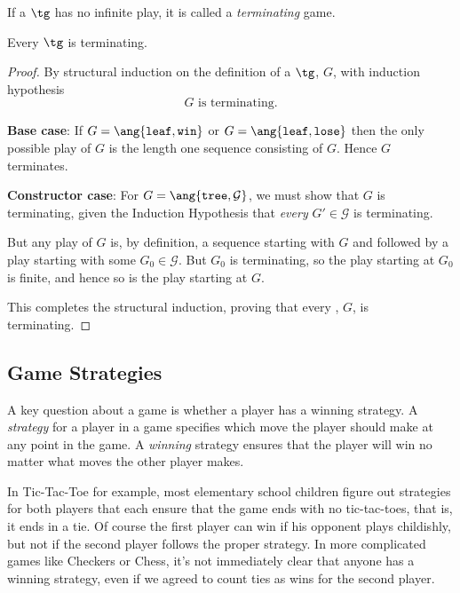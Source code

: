 \begin{definition}
\begin{definition}
If a $\tg$ has no infinite play, it is called a \emph{terminating} game.
\end{definition}

\begin{theorem}
Every $\tg$ is terminating.
\end{theorem}

\begin{proof}
By structural induction on the definition of a $\tg$, $G$, with induction
hypothesis
\[
G \text{ is terminating}.
\]

\textbf{Base case}: If $G = \ang{\texttt{leaf}, \texttt{win}}$ or $G =
\ang{\texttt{leaf}, \texttt{lose}}$ then the only possible play of $G$ is
the length one sequence consisting of $G$.  Hence $G$ terminates.

\textbf{Constructor case}: For $G = \ang{\texttt{tree},\mathcal{G}}$, we
must show that $G$ is terminating, given the Induction Hypothesis that
\emph{every} $G' \in \mathcal{G}$ is terminating.

But any play of $G$ is, by definition, a sequence starting with $G$ and
followed by a play starting with some $G_0 \in \mathcal{G}$.  But $G_0$ is
terminating, so the play starting at $G_0$ is finite, and hence so is the
play starting at $G$.

This completes the structural induction, proving that every \tg, $G$, is
terminating.
\end{proof}


\subsection{Game Strategies}

A key question about a game is whether a player has a winning strategy.  A
\emph{strategy} for a player in a game specifies which move the player
should make at any point in the game.  A \emph{winning} strategy ensures
that the player will win no matter what moves the other player makes.

In Tic-Tac-Toe for example, most elementary school children figure out
strategies for both players that each ensure that the game ends with no
tic-tac-toes, that is, it ends in a tie.  Of course the first player can
win if his opponent plays childishly, but not if the second player follows
the proper strategy.  In more complicated games like Checkers or Chess,
it's not immediately clear that anyone has a winning strategy, even if we
agreed to count ties as wins for the second player.


\end{definition}
